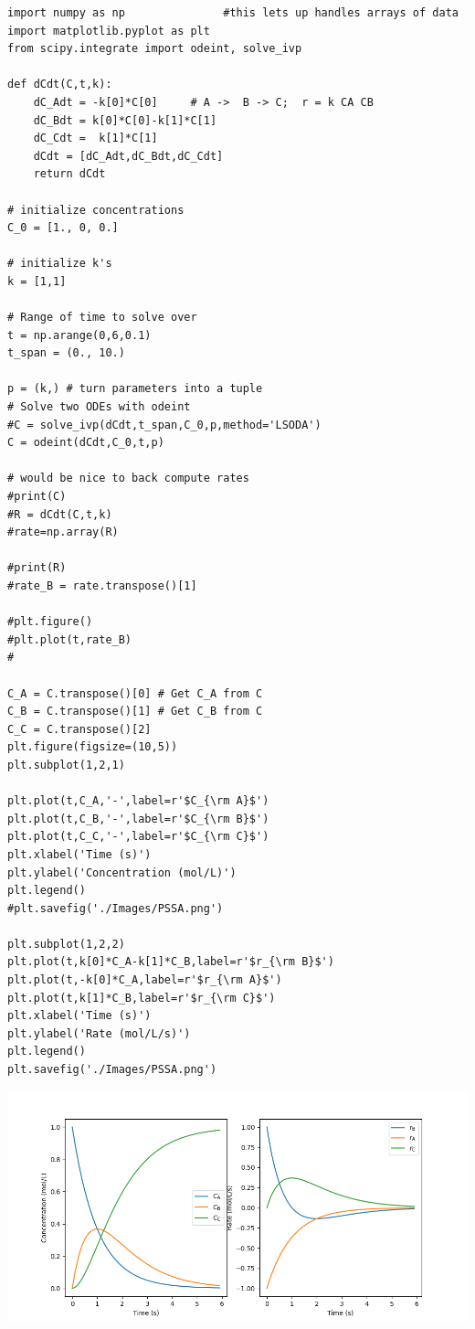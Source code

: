 \documentclass[11pt]{article}
\begin{document}
\begin{verbatim}
import numpy as np               #this lets up handles arrays of data
import matplotlib.pyplot as plt
from scipy.integrate import odeint, solve_ivp

def dCdt(C,t,k):
    dC_Adt = -k[0]*C[0]     # A ->  B -> C;  r = k CA CB
    dC_Bdt = k[0]*C[0]-k[1]*C[1]
    dC_Cdt =  k[1]*C[1]
    dCdt = [dC_Adt,dC_Bdt,dC_Cdt] 
    return dCdt

# initialize concentrations
C_0 = [1., 0, 0.]

# initialize k's
k = [1,1]

# Range of time to solve over
t = np.arange(0,6,0.1) 
t_span = (0., 10.)

p = (k,) # turn parameters into a tuple
# Solve two ODEs with odeint
#C = solve_ivp(dCdt,t_span,C_0,p,method='LSODA')
C = odeint(dCdt,C_0,t,p)

# would be nice to back compute rates
#print(C)
#R = dCdt(C,t,k)
#rate=np.array(R)

#print(R)
#rate_B = rate.transpose()[1]

#plt.figure()
#plt.plot(t,rate_B)
#

C_A = C.transpose()[0] # Get C_A from C
C_B = C.transpose()[1] # Get C_B from C
C_C = C.transpose()[2]
plt.figure(figsize=(10,5))
plt.subplot(1,2,1)

plt.plot(t,C_A,'-',label=r'$C_{\rm A}$')
plt.plot(t,C_B,'-',label=r'$C_{\rm B}$')
plt.plot(t,C_C,'-',label=r'$C_{\rm C}$')
plt.xlabel('Time (s)')
plt.ylabel('Concentration (mol/L)')
plt.legend()
#plt.savefig('./Images/PSSA.png')

plt.subplot(1,2,2)
plt.plot(t,k[0]*C_A-k[1]*C_B,label=r'$r_{\rm B}$')
plt.plot(t,-k[0]*C_A,label=r'$r_{\rm A}$')
plt.plot(t,k[1]*C_B,label=r'$r_{\rm C}$')
plt.xlabel('Time (s)')
plt.ylabel('Rate (mol/L/s)')
plt.legend()
plt.savefig('./Images/PSSA.png')
\end{verbatim}

\begin{center}
\includegraphics[width=.9\linewidth]{./Images/PSSA.png}
\end{center}
\end{document}

